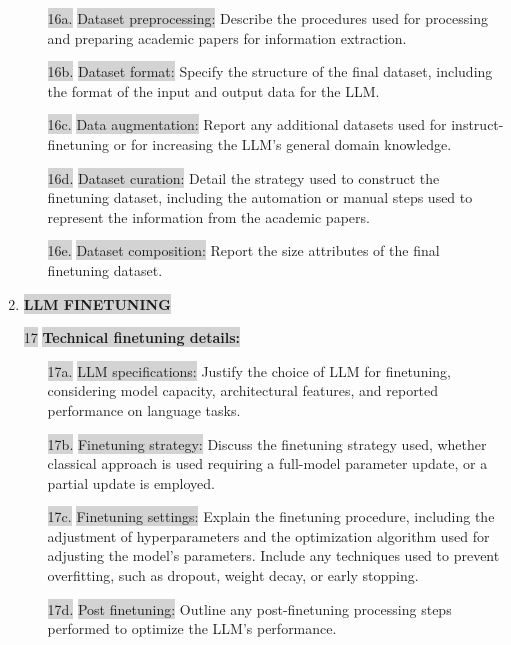 \documentclass{article}
\begin{document}
\begin{enumerate}
        \begin{itemize}
    \item[\colorbox{lightgray}{16a.}] \colorbox{lightgray}{Dataset preprocessing:} Describe the procedures used for processing and preparing academic papers for information extraction.
    \item[\colorbox{lightgray}{16b.}] \colorbox{lightgray}{Dataset format:} Specify the structure of the final dataset, including the format of the input and output data for the LLM.
    \item[\colorbox{lightgray}{16c.}] \colorbox{lightgray}{Data augmentation:} Report any additional datasets used for instruct-finetuning or for increasing the LLM's general domain knowledge.
    \item[\colorbox{lightgray}{16d.}] \colorbox{lightgray}{Dataset curation:} Detail the strategy used to construct the finetuning dataset, including the automation or manual steps used to represent the information from the academic papers.
    \item[\colorbox{lightgray}{16e.}] \colorbox{lightgray}{Dataset composition:} Report the size attributes of the final finetuning dataset.
        \end{itemize}

\item \colorbox{lightgray}{\textbf{LLM FINETUNING}}
    \item[\colorbox{lightgray}{17}] \colorbox{lightgray}{\textbf{Technical finetuning details:}}

    \begin{itemize}
    \item[\colorbox{lightgray}{17a.}] \colorbox{lightgray}{LLM specifications:} Justify the choice of LLM for finetuning, considering model capacity, architectural features, and reported performance on language tasks.
    \item[\colorbox{lightgray}{17b.}] \colorbox{lightgray}{Finetuning strategy:} Discuss the finetuning strategy used, whether classical approach is used requiring a full-model parameter update, or a partial update is employed.
    \item[\colorbox{lightgray}{17c.}] \colorbox{lightgray}{Finetuning settings:} Explain the finetuning procedure, including the adjustment of hyperparameters and the optimization algorithm used for adjusting the model's parameters. Include any techniques used to prevent overfitting, such as dropout, weight decay, or early stopping.
    \item[\colorbox{lightgray}{17d.}] \colorbox{lightgray}{Post finetuning:} Outline any post-finetuning processing steps performed to optimize the LLM's performance.
    \end{itemize}
    

\end{enumerate}
\end{document}
